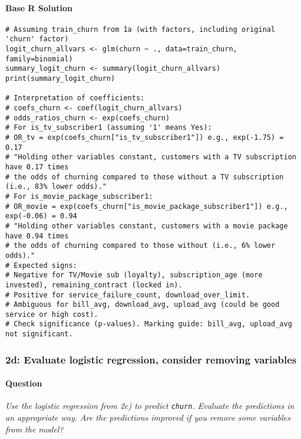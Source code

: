 \documentclass[12pt,a4paper]{article}
\newcommand{\Rcode}[1]{\texttt{#1}} %
\begin{document}
        \paragraph{Base R Solution}
\begin{lstlisting}
# Assuming train_churn from 1a (with factors, including original 'churn' factor)
logit_churn_allvars <- glm(churn ~ ., data=train_churn, family=binomial)
summary_logit_churn <- summary(logit_churn_allvars)
print(summary_logit_churn)

# Interpretation of coefficients:
# coefs_churn <- coef(logit_churn_allvars)
# odds_ratios_churn <- exp(coefs_churn)
# For is_tv_subscriber1 (assuming '1' means Yes):
# OR_tv = exp(coefs_churn["is_tv_subscriber1"]) e.g., exp(-1.75) = 0.17
# "Holding other variables constant, customers with a TV subscription have 0.17 times
# the odds of churning compared to those without a TV subscription (i.e., 83% lower odds)."
# For is_movie_package_subscriber1:
# OR_movie = exp(coefs_churn["is_movie_package_subscriber1"]) e.g., exp(-0.06) = 0.94
# "Holding other variables constant, customers with a movie package have 0.94 times
# the odds of churning compared to those without (i.e., 6% lower odds)."
# Expected signs:
# Negative for TV/Movie sub (loyalty), subscription_age (more invested), remaining_contract (locked in).
# Positive for service_failure_count, download_over_limit.
# Ambiguous for bill_avg, download_avg, upload_avg (could be good service or high cost).
# Check significance (p-values). Marking guide: bill_avg, upload_avg not significant.
\end{lstlisting}

    \subsubsection{2d: Evaluate logistic regression, consider removing variables}
        \paragraph{Question}
        \textit{Use the logistic regression from 2c) to predict \Rcode{churn}. Evaluate the predictions in an appropriate way. Are the predictions improved if you remove some variables from the model?}
\end{document}
